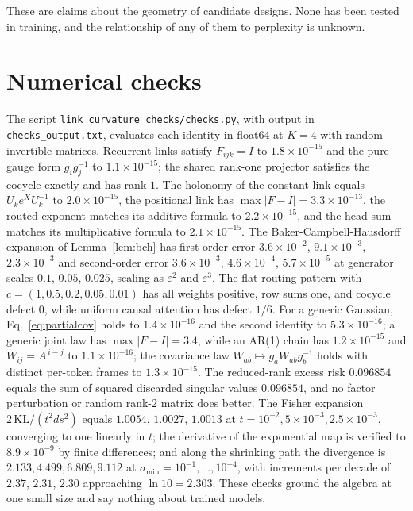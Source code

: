 \documentclass[11pt]{article}
\theoremstyle{definition}
\theoremstyle{remark}
\begin{document}
These are claims about the geometry of candidate designs. None has been tested in training, and the relationship of any of them to perplexity is unknown.

\section{Numerical checks}
\label{sec:checks}

The script \texttt{link\_curvature\_checks/checks.py}, with output in \texttt{checks\_output.txt}, evaluates each identity in float64 at $K=4$ with random invertible matrices. Recurrent links satisfy $F_{ijk}=I$ to $1.8\times10^{-15}$ and the pure-gauge form $g_ig_j^{-1}$ to $1.1\times10^{-15}$; the shared rank-one projector satisfies the cocycle exactly and has rank $1$. The holonomy of the constant link equals $U_ke^{X}U_k^{-1}$ to $2.0\times10^{-15}$, the positional link has $\max|F-I|=3.3\times10^{-13}$, the routed exponent matches its additive formula to $2.2\times10^{-15}$, and the head sum matches its multiplicative formula to $2.1\times10^{-15}$. The Baker-Campbell-Hausdorff expansion of Lemma~\ref{lem:bch} has first-order error $3.6\times10^{-2}$, $9.1\times10^{-3}$, $2.3\times10^{-3}$ and second-order error $3.6\times10^{-3}$, $4.6\times10^{-4}$, $5.7\times10^{-5}$ at generator scales $0.1$, $0.05$, $0.025$, scaling as $\varepsilon^2$ and $\varepsilon^3$. The flat routing pattern with $c=(1,0.5,0.2,0.05,0.01)$ has all weights positive, row sums one, and cocycle defect $0$, while uniform causal attention has defect $1/6$. For a generic Gaussian, Eq.~\eqref{eq:partialcov} holds to $1.4\times10^{-16}$ and the second identity to $5.3\times10^{-16}$; a generic joint law has $\max|F-I|=3.4$, while an AR(1) chain has $1.2\times10^{-15}$ and $W_{ij}=A^{\,i-j}$ to $1.1\times10^{-16}$; the covariance law $W_{ab}\mapsto g_aW_{ab}g_b^{-1}$ holds with distinct per-token frames to $1.3\times10^{-15}$. The reduced-rank excess risk $0.096854$ equals the sum of squared discarded singular values $0.096854$, and no factor perturbation or random rank-$2$ matrix does better. The Fisher expansion $2\,\mathrm{KL}/(t^2ds^2)$ equals $1.0054$, $1.0027$, $1.0013$ at $t=10^{-2},5\times10^{-3},2.5\times10^{-3}$, converging to one linearly in $t$; the derivative of the exponential map is verified to $8.9\times10^{-9}$ by finite differences; and along the shrinking path the divergence is $2.133,4.499,6.809,9.112$ at $\sigma_{\min}=10^{-1},\dots,10^{-4}$, with increments per decade of $2.37$, $2.31$, $2.30$ approaching $\ln10=2.303$. These checks ground the algebra at one small size and say nothing about trained models.
\end{document}

